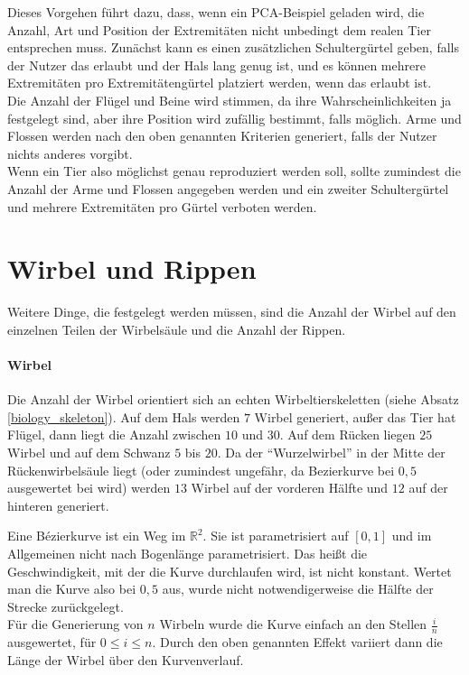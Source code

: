 
Dieses Vorgehen führt dazu, dass, wenn ein PCA-Beispiel geladen wird, die Anzahl, Art und Position der Extremitäten nicht unbedingt dem realen Tier entsprechen muss.
Zunächst kann es einen zusätzlichen Schultergürtel geben, falls der Nutzer das erlaubt und der Hals lang genug ist, und es können mehrere Extremitäten pro Extremitätengürtel platziert werden, wenn das erlaubt ist.\\
Die Anzahl der Flügel und Beine wird stimmen, da ihre Wahrscheinlichkeiten ja festgelegt sind, aber ihre Position wird zufällig bestimmt, falls möglich.  Arme und Flossen werden nach den oben genannten Kriterien generiert, falls der Nutzer nichts anderes vorgibt.\\
Wenn ein Tier also möglichst genau reproduziert werden soll, sollte zumindest die Anzahl der Arme und Flossen angegeben werden und ein zweiter Schultergürtel und mehrere Extremitäten pro Gürtel verboten werden.


\section{Wirbel und Rippen}
\label{section:vertebrae_ribs}

Weitere Dinge, die festgelegt werden müssen, sind die Anzahl der Wirbel auf den einzelnen Teilen der Wirbelsäule und die Anzahl der Rippen.

\paragraph{Wirbel}
Die Anzahl der Wirbel orientiert sich an echten Wirbeltierskeletten (siehe Absatz \ref{biology_skeleton}). Auf dem Hals werden $7$ Wirbel generiert, außer das Tier hat Flügel, dann liegt die Anzahl zwischen $10$ und $30$. Auf dem Rücken liegen $25$ Wirbel und auf dem Schwanz $5$ bis $20$.
Da der "`Wurzelwirbel"' in der Mitte der Rückenwirbelsäule liegt (oder zumindest ungefähr, da Bezierkurve bei $0,5$ ausgewertet bei wird) werden $13$ Wirbel auf der vorderen Hälfte und $12$ auf der hinteren generiert.

Eine Bézierkurve ist ein Weg im $\mathbb{R}^2$. Sie ist parametrisiert auf $[0, 1]$ und im Allgemeinen nicht nach Bogenlänge parametrisiert. Das heißt die Geschwindigkeit, mit der die Kurve durchlaufen wird, ist nicht konstant. Wertet man die Kurve also bei $0,5$ aus, wurde nicht notwendigerweise die Hälfte der Strecke zurückgelegt.\\
Für die Generierung von $n$ Wirbeln wurde die Kurve einfach an den Stellen $\frac{i}{n}$ ausgewertet, für $0 \leq i \leq n$. Durch den oben genannten Effekt variiert dann die Länge der Wirbel über den Kurvenverlauf.

